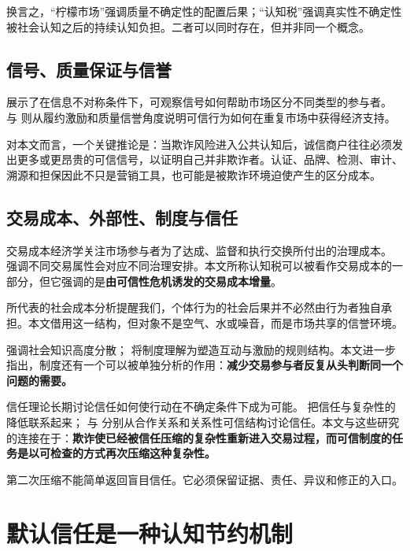 \documentclass[UTF8,12pt]{ctexart}
\begin{document}
换言之，“柠檬市场”强调质量不确定性的配置后果；“认知税”强调真实性不确定性被社会认知之后的持续认知负担。二者可以同时存在，但并非同一个概念。

\subsection{信号、质量保证与信誉}

\citet{spence1973signaling} 展示了在信息不对称条件下，可观察信号如何帮助市场区分不同类型的参与者。\citet{kleinleffler1981performance} 与 \citet{shapiro1983reputation} 则从履约激励和质量信誉角度说明可信行为如何在重复市场中获得经济支持。

对本文而言，一个关键推论是：当欺诈风险进入公共认知后，诚信商户往往必须发出更多或更昂贵的可信信号，以证明自己并非欺诈者。认证、品牌、检测、审计、溯源和担保因此不只是营销工具，也可能是被欺诈环境迫使产生的区分成本。

\subsection{交易成本、外部性、制度与信任}

交易成本经济学关注市场参与者为了达成、监督和执行交换所付出的治理成本。\citet{williamson1979transaction} 强调不同交易属性会对应不同治理安排。本文所称认知税可以被看作交易成本的一部分，但它强调的是\textbf{由可信性危机诱发的交易成本增量}。

\citet{coase1960socialcost} 所代表的社会成本分析提醒我们，个体行为的社会后果并不必然由行为者独自承担。本文借用这一结构，但对象不是空气、水或噪音，而是市场共享的信誉环境。

\citet{hayek1945knowledge} 强调社会知识高度分散；\citet{north1990institutions} 将制度理解为塑造互动与激励的规则结构。本文进一步指出，制度还有一个可以被单独分析的作用：\textbf{减少交易参与者反复从头判断同一个问题的需要。}

信任理论长期讨论信任如何使行动在不确定条件下成为可能。\citet{luhmann1979trust} 把信任与复杂性的降低联系起来；\citet{gambetta1988trust} 与 \citet{hardin2002trust} 分别从合作关系和关系性可信结构讨论信任。本文与这些研究的连接在于：\textbf{欺诈使已经被信任压缩的复杂性重新进入交易过程，而可信制度的任务是以可检查的方式再次压缩这种复杂性。}

第二次压缩不能简单返回盲目信任。它必须保留证据、责任、异议和修正的入口。

\section{默认信任是一种认知节约机制}
\end{document}
